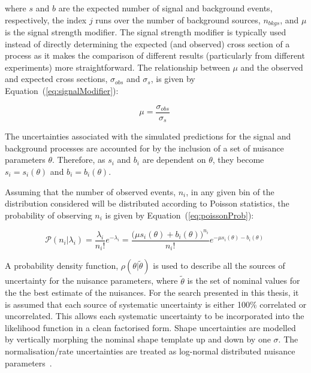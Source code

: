 where $s$ and $b$ are the expected number of signal and background events, respectively, the index $j$ runs over the number of background sources, $n_{bkgs}$, and $\mu$ is the signal strength modifier.
The signal strength modifier is typically used instead of directly determining the expected (and observed) cross section of a process as it makes the comparison of different results (particularly from different experiments) more straightforward. 
The relationship between $\mu$ and the observed and expected cross sections, $\sigma_{obs}$ and $\sigma_{s}$, is given by Equation~(\ref{eq:signalModifier}):

\begin{equation}
\mu = \frac{\sigma_{obs}}{\sigma_{s}}  \;
\label{eq:signalModifier}
\end{equation}
 
The uncertainties associated with the simulated predictions for the signal and background processes are accounted for by the inclusion of a set of nuisance parameters $\theta$.
Therefore, as $s_{i}$ and $b_{i}$ are dependent on $\theta$, they become $s_{i} = s_{i} (\theta)$ and $b_{i} = b_{i} (\theta)$.

Assuming that the number of observed events, $n_{i}$, in any given bin of the distribution considered will be distributed according to Poisson statistics, the probability of observing $n_{i}$ is given by Equation~(\ref{eq:poissonProb}):

\begin{equation}
\mathcal{P} ( n_{i} | \lambda_{i} ) = \frac{\lambda_{i}}{n_{i}!} e^{- \lambda_{i}} = \frac{ \big( \mu s_{i}(\theta) + b_{i}(\theta) \big)^{n_{i}}}{n_{i} !} e^{- \mu s_{i}(\theta) - b_{i}(\theta)}  \;
\label{eq:poissonProb}
\end{equation}

A probability density function, $\rho ( \theta | \tilde{\theta} )$ is used to describe all the sources of uncertainty for the nuisance parameters, where $\tilde{\theta}$ is the set of nominal values for the the best estimate of the nuisances.
For the search presented in this thesis, it is assumed that each source of systematic uncertainty is either 100\% correlated or uncorrelated.
This allows each systematic uncertainty to be incorporated into the likelihood function in a clean factorised form.
Shape uncertainties are modelled by vertically morphing the nominal shape template up and down by one $\sigma$.
The normalisation/rate uncertainties are treated as log-normal distributed nuisance parameters~\cite{AsymptoticFormulae,Baak:2014fta}.

